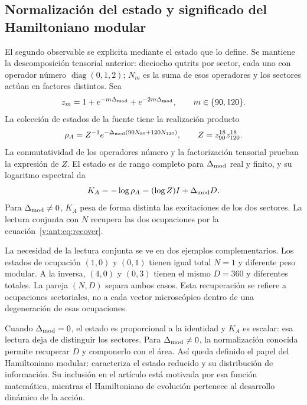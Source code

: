 \subsection{Normalización del estado y significado del Hamiltoniano modular}
El segundo observable se explicita mediante el estado que lo define.
Se mantiene la descomposición tensorial anterior: dieciocho qutrits
por sector, cada uno con operador número $\operatorname{diag}(0,1,2)$;
$N_m$ es la suma de esos operadores y los sectores actúan en factores
distintos. Sea
\[
 z_m=1+e^{-m\Delta_{\rm mod}}+e^{-2m\Delta_{\rm mod}},
 \qquad m\in\{90,120\}.
\]
La colección de estados de la fuente tiene la realización producto
\[
 \rho_A=Z^{-1}e^{-\Delta_{\rm mod}(90N_{90}+120N_{120})},
 \qquad Z=z_{90}^{18}z_{120}^{18}.
\]
La conmutatividad de los operadores número y la factorización tensorial
prueban la expresión de $Z$. El estado es de rango completo para
$\Delta_{\rm mod}$ real y finito, y su logaritmo espectral da
\[
 K_A=-\log\rho_A=(\log Z)I+\Delta_{\rm mod}D.
\]
Para $\Delta_{\rm mod}\ne0$, $K_A$ pesa de forma distinta las excitaciones
de los dos sectores. La lectura conjunta con $N$ recupera las dos ocupaciones
por la ecuación~\eqref{v:ant:eq:recover}.

La necesidad de la lectura conjunta se ve en dos ejemplos complementarios.
Los estados de ocupación $(1,0)$ y $(0,1)$ tienen igual total $N=1$
y diferente peso modular. A la inversa, $(4,0)$ y $(0,3)$ tienen
el mismo $D=360$ y diferentes totales. La pareja $(N,D)$ separa ambos
casos. Esta recuperación se refiere a ocupaciones sectoriales, no a
cada vector microscópico dentro de una degeneración de esas ocupaciones.

Cuando $\Delta_{\rm mod}=0$, el estado es proporcional a la identidad
y $K_A$ es escalar: esa lectura deja de distinguir los sectores.
Para $\Delta_{\rm mod}\ne0$, la normalización conocida permite recuperar
$D$ y componerlo con el área. Así queda definido el papel del Hamiltoniano
modular: caracteriza el estado reducido y su distribución de información.
Su inclusión en el artículo está motivada por esa función matemática,
mientras el Hamiltoniano de evolución pertenece al desarrollo dinámico
de la acción.
